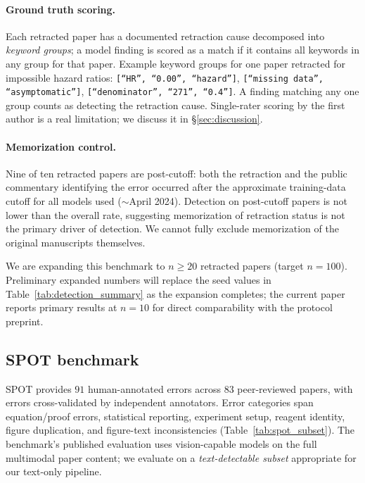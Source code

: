 \documentclass[11pt]{article}
\theoremstyle{definition}
\begin{document}
\paragraph{Ground truth scoring.} Each retracted paper has a documented retraction cause decomposed into \emph{keyword groups}; a model finding is scored as a match if it contains all keywords in any group for that paper. Example keyword groups for one paper retracted for impossible hazard ratios: \texttt{[``HR'', ``0.00'', ``hazard'']}, \texttt{[``missing data'', ``asymptomatic'']}, \texttt{[``denominator'', ``271'', ``0.4'']}. A finding matching any one group counts as detecting the retraction cause. Single-rater scoring by the first author is a real limitation; we discuss it in \S\ref{sec:discussion}.

\paragraph{Memorization control.} Nine of ten retracted papers are post-cutoff: both the retraction and the public commentary identifying the error occurred after the approximate training-data cutoff for all models used ($\sim$April 2024). Detection on post-cutoff papers is not lower than the overall rate, suggesting memorization of retraction status is not the primary driver of detection. We cannot fully exclude memorization of the original manuscripts themselves.

We are expanding this benchmark to $n \geq 20$ retracted papers (target $n = 100$). Preliminary expanded numbers will replace the seed values in Table~\ref{tab:detection_summary} as the expansion completes; the current paper reports primary results at $n = 10$ for direct comparability with the protocol preprint.

\subsection{SPOT benchmark}
\label{sec:bench:spot}

SPOT \citep{son2025spot} provides $91$ human-annotated errors across $83$ peer-reviewed papers, with errors cross-validated by independent annotators. Error categories span equation/proof errors, statistical reporting, experiment setup, reagent identity, figure duplication, and figure-text inconsistencies (Table~\ref{tab:spot_subset}). The benchmark's published evaluation uses vision-capable models on the full multimodal paper content; we evaluate on a \emph{text-detectable subset} appropriate for our text-only pipeline.
\end{document}
